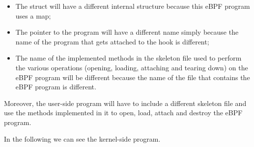 \begin{itemize}
	\item The struct will have a different internal structure because this eBPF
		program uses a map;
	\item The pointer to the program will have a different name simply because the 
		name of the program that gets attached to the hook is different; 
	\item The name of the implemented methods in the skeleton file used to perform the
		various operations (opening, loading, attaching and tearing down) on the eBPF program will be different because the name of the file that contains the eBPF program is different.
\end{itemize}

Moreover, the user-side program will have to include a different skeleton file and use the methods implemented in it to open, load, attach and destroy the eBPF program.

In the following we can see the kernel-side program.

